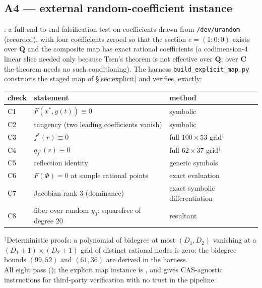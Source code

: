 \documentclass[11pt]{amsart}
\theoremstyle{definition}
\theoremstyle{remark}
\newcommand{\CC}{\mathbf{C}}
\newcommand{\QQ}{\mathbf{Q}}
\begin{document}
\subsection*{A4 --- external random-coefficient instance}\mbox{}\par
\noindent
{}: a full
end-to-end falsification test on coefficients drawn from
\texttt{/dev/urandom} (recorded), with four coefficients zeroed so that
the section $e=(1{:}0{:}0)$ exists over $\QQ$ and the composite map has
exact rational coefficients (a codimension-$4$ linear slice needed only
because Tsen's theorem is not effective over $\QQ$; over $\CC$ the theorem
needs no such conditioning).  The harness \texttt{build\_explicit\_map.py}
constructs the staged map of \S\ref{sec:explicit} and verifies, exactly:
\begin{center}
\begin{tabular}{@{}lll@{}}
\toprule
check & statement & method\\
\midrule
C1 & $F(x^*,y(t))\equiv0$ & symbolic\\
C2 & tangency (two leading coefficients vanish) & symbolic\\
C3 & $f^*(r)\equiv0$ & full $100\times53$ grid$^{\dagger}$\\
C4 & $q_{f^*}(r)\equiv0$ & full $62\times37$ grid$^{\dagger}$\\
C5 & reflection identity & generic symbols\\
C6 & $F(\Phi)=0$ at sample rational points & exact evaluation\\
C7 & Jacobian rank $3$ (dominance) & exact symbolic differentiation\\
C8 & fiber over random $y_0$: squarefree of degree $20$ & resultant\\
\bottomrule
\end{tabular}
\end{center}
{\small $^{\dagger}$Deterministic proofs: a polynomial of bidegree at most
$(D_1,D_2)$ vanishing at a $(D_1{+}1)\times(D_2{+}1)$ grid of distinct
rational nodes is zero; the bidegree bounds $(99,52)$ and $(61,36)$ are
derived in the harness.}\\[2pt]
All eight pass (); the explicit map instance is
, and  gives
CAS-agnostic instructions for third-party verification with no trust in
the pipeline.
\end{document}
